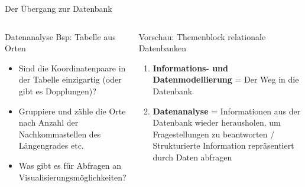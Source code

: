 \begin{frame}{Der Übergang zur Datenbank}
  \begin{columns}[T,onlytextwidth]
    \footnotesize
    \begin{block}{Datenanalyse Bsp: Tabelle aus Orten}
    \begin{itemize}
        \item Sind die Koordinatenpaare in der Tabelle einzigartig (oder gibt es Dopplungen)?
        \item Gruppiere und zähle die Orte nach Anzahl der Nachkommastellen des Längengrades etc. 
        \item Was gibt es für Abfragen an Visualisierungsmöglichkeiten?
    \end{itemize}
    \end{block}


      \begin{exampleblock}{Vorschau: Themenblock relationale Datenbanken}
      \begin{enumerate}\small
          \item  \textbf{Informations- und Datenmodellierung} = Der Weg in die Datenbank
          \item \textbf{Datenanalyse} = Informationen aus der Datenbank wieder herausholen, um Fragestellungen zu beantworten / Strukturierte Information repräsentiert durch Daten abfragen
      \end{enumerate} 
      \end{exampleblock}
  \end{columns}
\end{frame}

